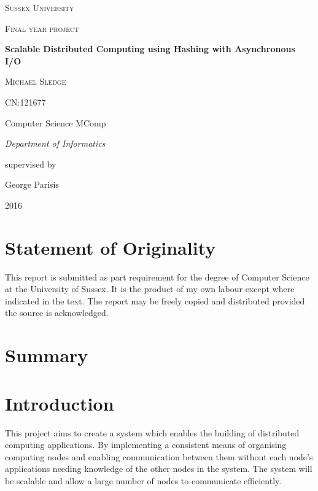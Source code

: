 \documentclass{article}
\begin{document}
\begin{titlepage}
	\centering
	{\scshape\LARGE Sussex University \par}
	\vspace{1cm}
	{\scshape\Large Final year project\par}
	\vspace{1.5cm}
	{\huge\bfseries Scalable Distributed Computing using Hashing with Asynchronous I/O\par}
	\vspace{2cm}
	{\Large\scshape Michael Sledge\par}
	{\Large CN:121677\par}
	\vspace{1cm}
	{\Large Computer Science MComp\par}
	{\Large\itshape Department of Informatics\par}
	\vspace{1cm}
	supervised by\par
	George Parisis

	\vfill

	{\large 2016\par}
\end{titlepage}

\section{Statement of Originality}
This report is submitted as part requirement for the degree of Computer Science at the University of Sussex. It is the product of my own labour except where indicated in the text. The report may be freely copied and distributed provided the source is acknowledged.
\newpage

\section{Summary}


\newpage
\tableofcontents
\newpage


\section{Introduction}

This project aims to create a system which  enables the building of distributed computing applications.
By implementing a consistent means of organising computing nodes and enabling communication between them without each node's applications needing knowledge of the other nodes in the system.
The system will be scalable and allow a large number of nodes to communicate efficiently.
\end{document}
